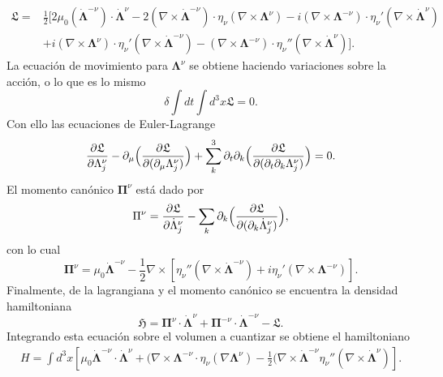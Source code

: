 \begin{align}
\nonumber \mathfrak{L}=&\frac{1}{2}[2\mu_0(\dot{\mathbf{\Lambda}}^{-\nu})\cdot\dot{\mathbf{\Lambda}}^{\nu}-2(\nabla\times\dot{\mathbf{\Lambda}}^{-\nu})\cdot\eta_{\nu}(\nabla\times\mathbf{\Lambda}^{\nu})-i(\nabla \times \mathbf{\Lambda}^{-\nu})\cdot\eta_{\nu}'(\nabla\times\dot{\mathbf{\Lambda}}^{\nu})\\
&+i(\nabla \times\mathbf{\Lambda}^{\nu} )\cdot\eta_{\nu}'(\nabla\times\dot{\mathbf{\Lambda}}^{-\nu})-(\nabla \times\mathbf{\Lambda}^{-\nu} )\cdot\eta_{\nu}''(\nabla\times\dot{\mathbf{\Lambda}}^{\nu})].
\end{align}
La ecuaci\'{o}n de movimiento para $\mathbf{\Lambda}^{\nu}$ se obtiene haciendo variaciones sobre la acci\'{o}n, o lo que es lo mismo 
\begin{equation}
\delta\int dt\int d^3x\mathfrak{L}=0.
\end{equation}
Con ello las ecuaciones de Euler-Lagrange
\begin{align}
\frac{\partial \mathfrak{L}}{\partial\Lambda^{\nu}_j}-\partial_{\mu}\Bigl(\frac{\partial \mathfrak{L}}{\partial(\partial_{\mu}\Lambda^{\nu}_j)}\Bigr)+\sum_k^3\partial_t\partial_k\Bigl(\frac{\partial \mathfrak{L}}{\partial(\partial_t\partial_k\Lambda^{\nu}_j)}\Bigr)=0.
\end{align}
El momento can\'{o}nico $\mathbf{\Pi}^{\nu}$ est\'{a} dado por
\begin{equation}
\Pi^{\nu}=\frac{\partial \mathfrak{L}}{\partial \dot{\Lambda}_j^{\nu}}-\sum_k\partial_k\Bigl(\frac{\partial\mathfrak{L}}{\partial(\partial_k\dot{\Lambda}_j^{\nu})}\Bigr),
\end{equation}
con lo cual
\begin{equation}
\mathbf{\Pi}^{\nu}=\mu_0\dot{\mathbf{\Lambda}}^{-\nu}-\frac{1}{2}\nabla\times[\eta_{\nu}''(\nabla\times \dot{\mathbf{\Lambda}}^{-\nu})+i\eta_{\nu}'(\nabla\times \mathbf{\Lambda}^{-\nu})].
\end{equation}
Finalmente, de la lagrangiana y el momento can\'{o}nico se encuentra la densidad hamiltoniana
\begin{equation}\label{ec:densityhamiltonian}
\mathfrak{H}=\mathbf{\Pi}^{\nu}\cdot\dot{\mathbf{\Lambda}}^{\nu}+\mathbf{\Pi}^{-\nu}\cdot\dot{\mathbf{\Lambda}}^{-\nu}-\mathfrak{L}.
\end{equation}
Integrando esta ecuaci\'{o}n sobre el volumen a cuantizar se obtiene el hamiltoniano
\begin{align}\label{ec:hamiltonianoclasico}
H=\int d^3x[\mu_0\dot{\mathbf{\Lambda}}^{-\nu}\cdot \dot{\mathbf{\Lambda}}^{\nu}+(\nabla \times \mathbf{\Lambda}^{-\nu}\cdot\eta_{\nu}(\nabla \mathbf{\Lambda}^{\nu})-\frac{1}{2}(\nabla\times \dot{\mathbf{\Lambda}}^{-\nu}\eta_{\nu}''(\nabla\times\dot{\mathbf{\Lambda}}^{\nu})].
\end{align}
